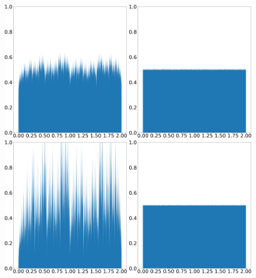 \begin{figure}
    \centering
    \includegraphics[width=0.48\textwidth]{tent_wave_shadow_density_0.05.png}
    \hspace{0.02\textwidth}
    \includegraphics[width=0.48\textwidth]{tent_wave_physical_density_0.05.png}
    \\ \vspace{0.02\textwidth}
    \includegraphics[width=0.48\textwidth]{tent_wave_shadow_density_0.2.png}
    \hspace{0.02\textwidth}
    \includegraphics[width=0.48\textwidth]{tent_wave_physical_density_0.2.png}

\end{figure}

